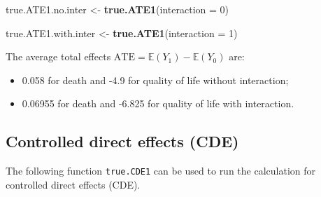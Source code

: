 \documentclass[
]{book}
\newenvironment{Shaded}{\begin{snugshade}}{\end{snugshade}}
\newcommand{\AttributeTok}[1]{\textcolor[rgb]{0.13,0.29,0.53}{#1}}
\newcommand{\DecValTok}[1]{\textcolor[rgb]{0.00,0.00,0.81}{#1}}
\newcommand{\FunctionTok}[1]{\textcolor[rgb]{0.13,0.29,0.53}{\textbf{#1}}}
\newcommand{\NormalTok}[1]{#1}
\newcommand{\OtherTok}[1]{\textcolor[rgb]{0.56,0.35,0.01}{#1}}
\providecommand{\tightlist}{%
  \setlength{\itemsep}{0pt}\setlength{\parskip}{0pt}}
\begin{document}
\begin{Shaded}
\begin{Highlighting}[]
\NormalTok{true.ATE1.no.inter }\OtherTok{\textless{}{-}} \FunctionTok{true.ATE1}\NormalTok{(}\AttributeTok{interaction =} \DecValTok{0}\NormalTok{)}

\NormalTok{true.ATE1.with.inter }\OtherTok{\textless{}{-}} \FunctionTok{true.ATE1}\NormalTok{(}\AttributeTok{interaction =} \DecValTok{1}\NormalTok{)}
\end{Highlighting}
\end{Shaded}

The average total effects \(\text{ATE} = \mathbb{E}(Y_1) - \mathbb{E}(Y_0)\) are:

\begin{itemize}
\tightlist
\item
  0.058 for death and -4.9 for quality of life without interaction;
\item
  0.06955 for death and -6.825 for quality of life with interaction.
\end{itemize}

\subsection{Controlled direct effects (CDE)}\label{controlled-direct-effects-cde}

The following function \texttt{true.CDE1} can be used to run the calculation for controlled direct effects (CDE).
\end{document}
